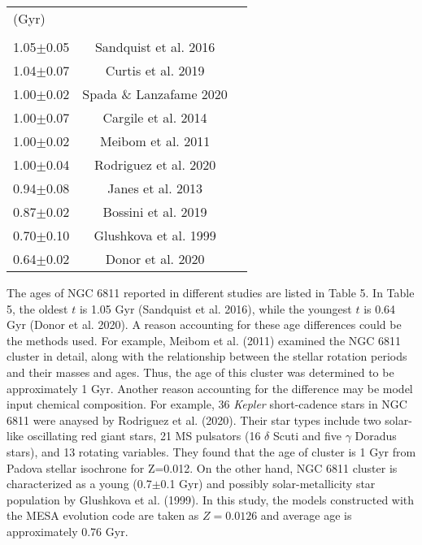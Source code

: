 \documentclass[a4paper,fleqn,usenatbib]{mnras}     %
\begin{document}
{\begin{table}
\begin{center}
\begin{tabular}{lcc}
(Gyr)&&\\ \\[1.0pt]
  \hline
1.05$\pm$0.05& Sandquist et al. 2016\\[2.0pt]
1.04$\pm$0.07& Curtis et al. 2019\\[2.0pt]
1.00$\pm$0.02&Spada \& Lanzafame 2020\\[2.0pt]
1.00$\pm$0.07& Cargile et al. 2014\\[2.0pt]
1.00$\pm$0.02&Meibom et al. 2011\\[2.0pt]
1.00$\pm$0.04&Rodriguez et al. 2020\\[2.0pt] 
0.94$\pm$0.08& Janes et al. 2013\\[2.0pt]
0.87$\pm$0.02&Bossini et al. 2019\\[2.0pt]
0.70$\pm$0.10& Glushkova et al. 1999\\[2.0pt]
0.64$\pm$0.02& Donor et al. 2020\\[2.0pt]
               \hline
        \end{tabular}
\end{center}
\end{table}

The ages of NGC 6811 reported in different studies are listed in Table 5.
In Table 5, the oldest $t$ is 1.05 Gyr (Sandquist et al. 2016), while 
the youngest $t$ is 0.64 Gyr (Donor et al. 2020).
A reason accounting for these age differences could
 be the methods used.
For example, Meibom et al. (2011) 
examined the NGC 6811 cluster in detail, 
along with the relationship between the 
stellar rotation periods and their masses and ages. 
Thus, the age of this cluster was determined to be approximately 1 Gyr.
Another reason accounting for the difference 
may be model input chemical composition.
For example, 36 {\emph{Kepler}} 
short-cadence stars in 
NGC 6811 were anaysed by Rodriguez et al. (2020). 
Their star types include two solar-like oscillating red giant stars, 21 MS pulsators (16 $\delta$ Scuti and five $\gamma$ Doradus stars), 
and 13 rotating variables. 
They found that the age of cluster is 1 Gyr from Padova stellar isochrone %
for Z=0.012.
On the other hand, NGC 6811 cluster  is characterized as a young 
(0.7$\pm$0.1 Gyr) and possibly 
solar-metallicity star population by Glushkova et al. (1999).
In this study, the models constructed with 
the {\small {MESA}} evolution code are taken as $Z=0.0126$
and average age is approximately 0.76 Gyr.

}
\end{document}
